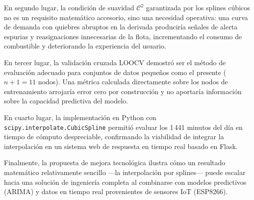 \documentclass[conference]{IEEEtran}
\begin{document}
En segundo lugar, la condición de suavidad $\mathcal{C}^2$ garantizada por los splines cúbicos no es un requisito
matemático accesorio, sino una necesidad operativa: una curva de demanda con quiebres abruptos en la derivada produciría
señales de alerta espurias y reasignaciones innecesarias de la flota, incrementando el consumo de combustible y
deteriorando la experiencia del usuario.

En tercer lugar, la validación cruzada LOOCV demostró ser el método de evaluación adecuado para conjuntos de datos
pequeños como el presente ($n+1 = 11$ nodos). Una métrica calculada directamente sobre los nodos de entrenamiento
arrojaría error cero por construcción y no aportaría información sobre la capacidad predictiva del modelo.

En cuarto lugar, la implementación en Python con \texttt{scipy.interpolate.CubicSpline} permitió evaluar los 1\,441
minutos del día en tiempo de cómputo despreciable, confirmando la viabilidad de integrar la interpolación en un sistema
web de respuesta en tiempo real basado en Flask.

Finalmente, la propuesta de mejora tecnológica ilustra cómo un resultado matemático relativamente sencillo —la
interpolación por splines— puede escalar hacia una solución de ingeniería completa al combinarse con modelos predictivos
(ARIMA) y datos en tiempo real provenientes de sensores IoT (ESP8266).


\end{document}

